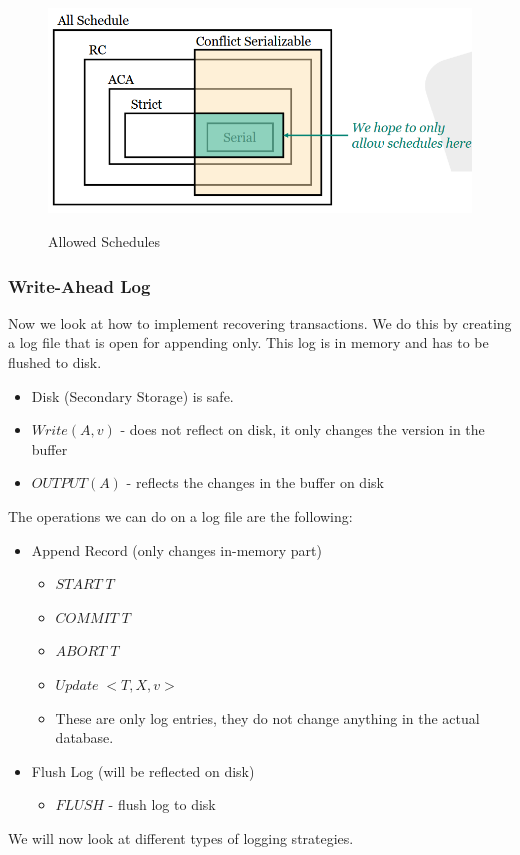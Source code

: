 \begin{figure}[H]
\centering
\includegraphics[width=.6\textwidth]{images/allowed_schedules.PNG}
\label{allowed_schedules}
\caption{Allowed Schedules}
\end{figure}

\subsubsection{Write-Ahead Log}
Now we look at how to implement recovering transactions. We do this by creating a log file that is open for appending only. This log is in memory and has to be flushed to disk.
\begin{itemize}
\item Disk (Secondary Storage) is safe.
\item $Write(A, v)$ - does not reflect on disk, it only changes the version in the buffer
\item $OUTPUT(A)$ - reflects the changes in the buffer on disk
\end{itemize}
The operations we can do on a log file are the following:
\begin{itemize}
\item Append Record (only changes in-memory part)
\begin{itemize}
\item $START \; T$
\item $COMMIT\;T$
\item $ABORT\;T$
\item $Update\;<T, X, v>$
\item These are only log entries, they do not change anything in the actual database.
\end{itemize}
\item Flush Log (will be reflected on disk)
\begin{itemize}
\item $FLUSH$ - flush log to disk
\end{itemize}
\end{itemize}
We will now look at different types of logging strategies.\vspace{.3cm}\\

